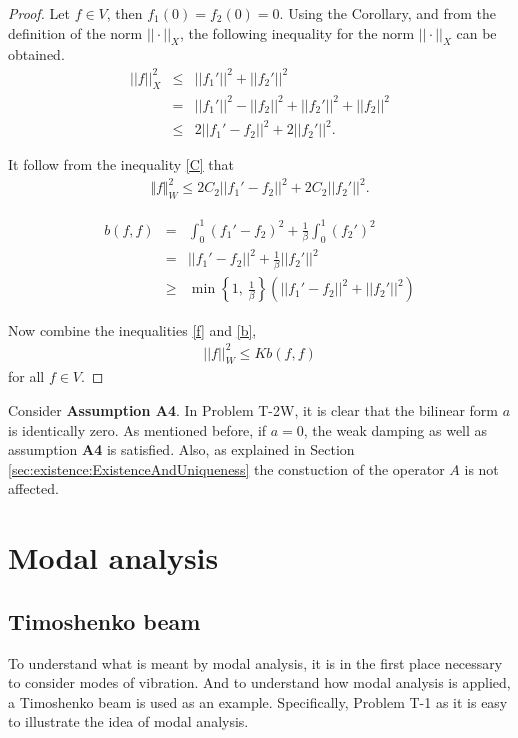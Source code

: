 \documentclass[../../main.tex]{subfiles}
\begin{document}
\begin{proof}
	Let $f \in V$, then $f_1(0) = f_2(0) = 0$. Using the Corollary, and from the definition of the norm $||\cdot||_X$, the following inequality for the norm $||\cdot||_X$ can be obtained.
	\begin{eqnarray*}
		||f||_X^2 & \leq & ||f_1'||^2 + ||f_2'||^2 \\
		& = & ||f_1'||^2 -||f_2||^2 + ||f_2'||^2 +||f_2||^2\\
		& \leq & 2||f_1'-f_2||^2 + 2||f_2'||^2.
	\end{eqnarray*}

	It follow from the inequality \eqref{C} that
	\begin{eqnarray}
		\Vert f \Vert_{W}^2 \leq 2C_2||f_1'-f_2||^2 + 2C_2||f_2'||^2. \label{f}
	\end{eqnarray}

	\begin{eqnarray}
		b(f,f) & = &   \int_0^1 (f_1'-f_2)^2 + \frac{1}{\beta}\int_0^1  (f_2')^2 \nonumber\\
		& = & ||f_1' - f_2||^2 + \frac{1}{\beta}||f_2'||^2 \nonumber\\
		& \geq & \min\left\{1 ,\ \frac{1}{\beta} \right\} \left( ||f_1' - f_2||^2 + ||f_2'||^2\right) \label{b}
	\end{eqnarray}

	Now combine the inequalities \eqref{f} and \eqref{b},
	\begin{eqnarray*}
		||f||_W^2 \leq Kb(f,f)
	\end{eqnarray*} for all $f \in V$.
\end{proof}


Consider \textbf{Assumption A4}. In Problem T-2W, it is clear that the bilinear form $a$ is identically zero. As mentioned before, if $a = 0$, the weak damping as well as assumption \textbf{A4} is satisfied. Also, as explained in Section \ref{sec:existence:ExistenceAndUniqueness} the constuction of the operator $A$ is not affected.\\


\section{Modal analysis}\label{sec:existence:ModalAnalysis}
\subsection{Timoshenko beam}
To understand what is meant by modal analysis, it is in the first place necessary to consider modes of vibration. And to understand how modal analysis is applied, a Timoshenko beam is used as an example. Specifically, Problem T-1 as it is easy to illustrate the idea of modal analysis.\\
\end{document}
